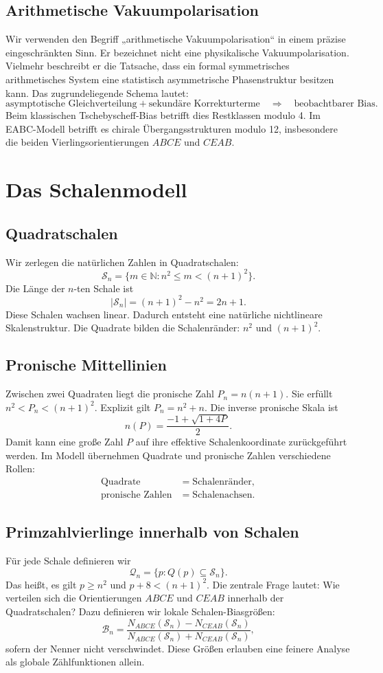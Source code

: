 \documentclass[11pt,a4paper,bibliography=totoc]{scrartcl}
\begin{document}
\subsection{Arithmetische Vakuumpolarisation}
Wir verwenden den Begriff „arithmetische Vakuumpolarisation“ in einem präzise eingeschränkten Sinn. Er bezeichnet nicht eine physikalische Vakuumpolarisation. Vielmehr beschreibt er die Tatsache, dass ein formal symmetrisches arithmetisches System eine statistisch asymmetrische Phasenstruktur besitzen kann. Das zugrundeliegende Schema lautet:
\[
\text{asymptotische Gleichverteilung} + \text{sekundäre Korrekturterme} \quad \Rightarrow \quad \text{beobachtbarer Bias}.
\]
Beim klassischen Tschebyscheff-Bias betrifft dies Restklassen modulo 4. Im EABC-Modell betrifft es chirale Übergangsstrukturen modulo 12, insbesondere die beiden Vierlingsorientierungen $ABCE$ und $CEAB$.

\section{Das Schalenmodell}

\subsection{Quadratschalen}
Wir zerlegen die natürlichen Zahlen in Quadratschalen:
\[
\mathcal{S}_n = \{m \in \mathbb{N} : n^2 \leq m < (n+1)^2\}.
\]
Die Länge der $n$-ten Schale ist
\[
|\mathcal{S}_n| = (n+1)^2 - n^2 = 2n + 1.
\]
Diese Schalen wachsen linear. Dadurch entsteht eine natürliche nichtlineare Skalenstruktur. Die Quadrate bilden die Schalenränder: $n^2$ und $(n+1)^2$.

\subsection{Pronische Mittellinien}
Zwischen zwei Quadraten liegt die pronische Zahl $P_n = n(n+1)$. Sie erfüllt $n^2 < P_n < (n+1)^2$. Explizit gilt $P_n = n^2 + n$. Die inverse pronische Skala ist
\[
n(P) = \frac{-1 + \sqrt{1 + 4P}}{2}.
\]
Damit kann eine große Zahl $P$ auf ihre effektive Schalenkoordinate zurückgeführt werden. Im Modell übernehmen Quadrate und pronische Zahlen verschiedene Rollen:
\begin{align*}
\text{Quadrate} &= \text{Schalenränder}, \\
\text{pronische Zahlen} &= \text{Schalenachsen}.
\end{align*}

\subsection{Primzahlvierlinge innerhalb von Schalen}
Für jede Schale definieren wir
\[
\mathcal{Q}_n = \{p : Q(p) \subseteq \mathcal{S}_n\}.
\]
Das heißt, es gilt $p \geq n^2$ und $p+8 < (n+1)^2$. Die zentrale Frage lautet: Wie verteilen sich die Orientierungen $ABCE$ und $CEAB$ innerhalb der Quadratschalen? Dazu definieren wir lokale Schalen-Biasgrößen:
\[
\mathcal{B}_n = \frac{N_{ABCE}(\mathcal{S}_n) - N_{CEAB}(\mathcal{S}_n)}{N_{ABCE}(\mathcal{S}_n) + N_{CEAB}(\mathcal{S}_n)},
\]
sofern der Nenner nicht verschwindet. Diese Größen erlauben eine feinere Analyse als globale Zählfunktionen allein.
\end{document}
